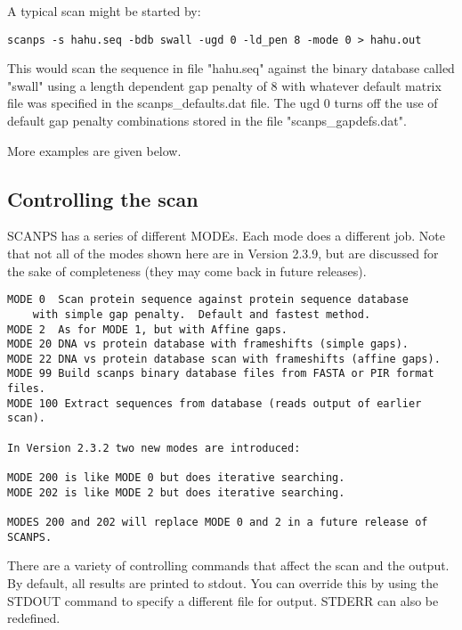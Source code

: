 \documentclass[12pt]{article}
\begin{document}
A typical scan might be started by:

\begin{verbatim}
scanps -s hahu.seq -bdb swall -ugd 0 -ld_pen 8 -mode 0 > hahu.out
\end{verbatim}

This would scan the sequence in file "hahu.seq" against the binary
database called "swall" using a length dependent gap penalty of 8 with
whatever default matrix file was specified in the scanps\_defaults.dat
file.  The ugd 0 turns off the use of default gap penalty combinations 
stored in the file "scanps\_gapdefs.dat".

More examples are given below.


\subsection{Controlling the scan}

SCANPS has a series of different MODEs.  Each mode does a different
job.  Note that not all of the modes shown here are in Version 2.3.9,
but are discussed for the sake of completeness (they may come back in
future releases).

\begin{scriptsize}
\begin{verbatim}
MODE 0	Scan protein sequence against protein sequence database
	with simple gap penalty.  Default and fastest method.
MODE 2	As for MODE 1, but with Affine gaps.
MODE 20 DNA vs protein database with frameshifts (simple gaps).
MODE 22 DNA vs protein database scan with frameshifts (affine gaps).
MODE 99 Build scanps binary database files from FASTA or PIR format files.
MODE 100 Extract sequences from database (reads output of earlier scan).

In Version 2.3.2 two new modes are introduced:

MODE 200 is like MODE 0 but does iterative searching.
MODE 202 is like MODE 2 but does iterative searching.

MODES 200 and 202 will replace MODE 0 and 2 in a future release of SCANPS.

\end{verbatim}
\end{scriptsize}

There are a variety of controlling commands that affect the scan and
the output.  By default, all results are printed to stdout.  You can 
override this by using the STDOUT command to specify a different file for 
output.  STDERR can also be redefined.
\end{document}
